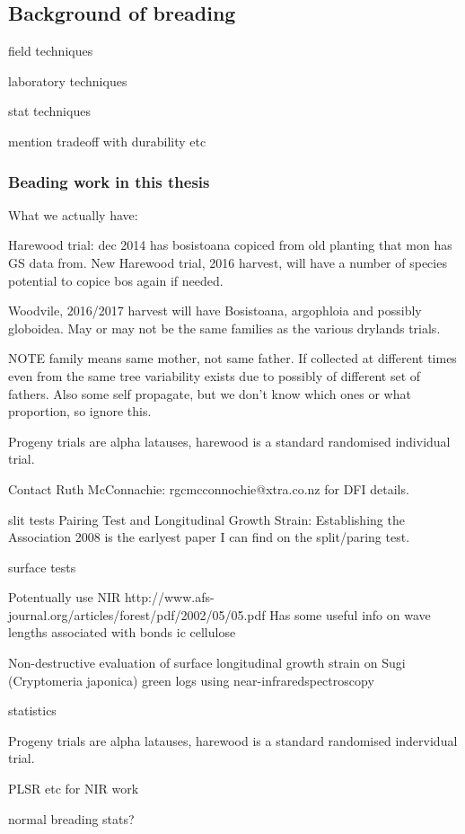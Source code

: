 \documentclass{article}
\begin{document}
\subsection{Background of breading}

field techniques

laboratory techniques

stat techniques

mention tradeoff with durability etc

\subsubsection{Beading work in this thesis}
What we actually have:

Harewood trial:
dec 2014 has bosistoana copiced from old planting that mon has GS data from.
New Harewood trial, 2016 harvest, will have a number of species potential to
copice bos again if needed.

Woodvile, 2016/2017 harvest will have Bosistoana, argophloia and possibly globoidea.
May or may not be the same families as the various drylands trials.

NOTE family means same mother, not same father.
If collected at different times even from the same tree variability exists due
to possibly of different set of fathers. Also some self propagate, but we don't
know which ones or what proportion, so ignore this.

Progeny trials are alpha latauses, harewood is a standard randomised individual
trial.

Contact Ruth McConnachie: rgcmcconnochie@xtra.co.nz for DFI details.

slit tests
Pairing Test and Longitudinal Growth Strain: Establishing the Association 2008
is the earlyest paper I can find on the split/paring test.

surface tests

Potentually use NIR
http://www.afs-journal.org/articles/forest/pdf/2002/05/05.pdf
Has some useful info on wave lengths associated with bonds ic cellulose

Non-destructive evaluation of surface longitudinal growth strain
on Sugi (Cryptomeria japonica) green logs using near-infraredspectroscopy

statistics

Progeny trials are alpha latauses, harewood is a standard randomised indervidual
trial.

PLSR etc for NIR work

normal breading stats?
\end{document}
